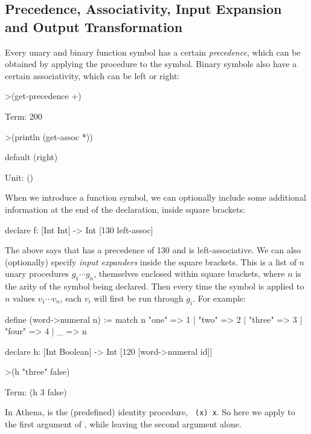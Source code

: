 \subsection{Precedence, Associativity, Input Expansion and Output Transformation}
Every unary and binary function symbol has a certain \emph{precedence}, which can be obtained by applying the procedure  to the symbol.
Binary symbols also have a certain associativity, which can be left or right: 
\begin{tcAthena}[upquote=true]
>(get-precedence +)

Term: 200

>(println (get-assoc *))

default (right)

Unit: ()
\end{tcAthena}

When we introduce a function symbol, we can optionally include some additional information at the end of the declaration, inside square brackets:
\begin{tcAthena}[upquote=true]
declare f: [Int Int] -> Int [130 left-assoc]
\end{tcAthena}
The above says that  has a precedence of 130 and is left-associative.  
We can also (optionally) specify {\em input expanders\/} inside the square brackets. This is a list
of $n$ unary procedures $g_1 \cdots g_n$, themselves enclosed within square brackets, where $n$ is the arity of the symbol being declared. 
Then every time the symbol is applied to $n$ values $v_1 \cdots v_n$, each $v_i$ will first be run through $g_i$. For example:
\begin{tcAthena}[upquote=true]
define (word->numeral n) := 
  match n {
    "one" => 1 | "two" => 2 | "three" => 3 | "four" => 4 | _ => n 
  }

declare h: [Int Boolean] -> Int [120 [word->numeral id]]

>(h "three" false)

Term: (h 3 false)
\end{tcAthena}
In Athena,  is the (predefined) identity procedure, \mbox{\tt {} (x) x}. So here we apply  to the first argument of , while leaving the second argument alone. 

